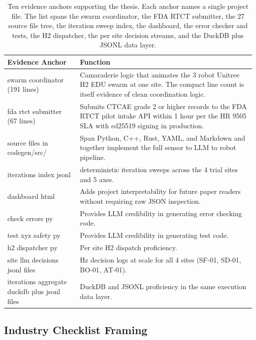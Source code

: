 \begin{sectionaccent}
\begin{table}[H]
\captionsetup{type=table}
\caption{Ten evidence anchors supporting the thesis. Each anchor
names a single project file. The list spans the swarm coordinator,
the FDA RTCT submitter, the 27 source file tree, the iteration
sweep index, the dashboard, the error checker and tests, the H2
dispatcher, the per site decision streams, and the DuckDB plus JSONL
data layer.}
\label{tbl:evidence-anchors}
\small
\begin{tabular}{>{\raggedright\arraybackslash}p{5cm}
                >{\raggedright\arraybackslash}p{10cm}}
\toprule
\textbf{Evidence Anchor} & \textbf{Function} \\
\midrule
swarm coordinator (191 lines) & Camaraderie logic that animates the 3 robot Unitree H2 EDU swarm at one site. The compact line count is itself evidence of clean coordination logic. \\
fda rtct submitter (67 lines) & Submits CTCAE grade 2 or higher records to the FDA RTCT pilot intake API within 1 hour per the HR 9505 SLA with ed25519 signing in production. \\
27 source files in codegen/src/ & Span Python, C++, Rust, YAML, and Markdown and together implement the full sensor to LLM to robot pipeline. \\
iterations index jsonl & 32 deterministic iteration sweeps across the 4 trial sites and 5 axes. \\
dashboard html & Adds project interpretability for future paper readers without requiring raw JSON inspection. \\
check errors py & Provides LLM credibility in generating error checking code. \\
test xyz safety py & Provides LLM credibility in generating test code. \\
h2 dispatcher py & Per site H2 dispatch proficiency. \\
4 site llm decisions jsonl files & 1 Hz decision logs at scale for all 4 sites (SF-01, SD-01, BO-01, AT-01). \\
iterations aggregate duckdb plus jsonl files & DuckDB and JSONL proficiency in the same execution data layer. \\
\bottomrule
\end{tabular}
\end{table}

\subsection{Industry Checklist Framing}
\label{sec:conclusions-checklist}


\end{sectionaccent}
